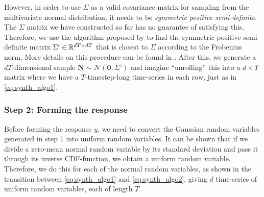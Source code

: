 \documentclass{statsmsc}
\begin{document}
{However, in order to use $\Sigma$ as a valid covariance matrix for sampling from the
multivariate normal distribution, it needs to be
\textit{symmetric positive semi-definite}. The $\Sigma$ matrix we have constructed so far has no
guarantee of satisfying this. Therefore, we use the algorithm proposed by
\cite{nearest_psd} to find the symmetric positive semi-definite matrix
$\Sigma' \in \mathbb{R}^{dT \times dT}$ that is closest to $\Sigma$ according to the Frobenius norm.
More details on this procedure can be found in \cite{nearest_psd}.
After this, we generate a $dT$-dimensional sample $\mathbf{N} \sim
\mathcal{N}(\mathbf{0}, \Sigma')$ and imagine ``unrolling'' this into a
$d\times T$ matrix where we have a $T$-timestep-long time-series in each row,
just as in \cref{eq:synth_algo1}.

\subsubsection{Step 2: Forming the response}%
\label{ssub:Step 2: Forming the response}

Before forming the response $y$, we need to convert the Gaussian random variables generated in
step 1 into uniform random variables. It can be shown that if we divide a zero-mean normal random
variable by its standard deviation and pass it through its inverse \ac{CDF}-function, we obtain
a uniform random variable. Therefore, we do this for each of the normal random variables, as shown
in the transition between \cref{eq:synth_algo1} and \cref{eq:synth_algo2}, giving $d$ time-series
of uniform random variables, each of length $T$.

}
\end{document}
